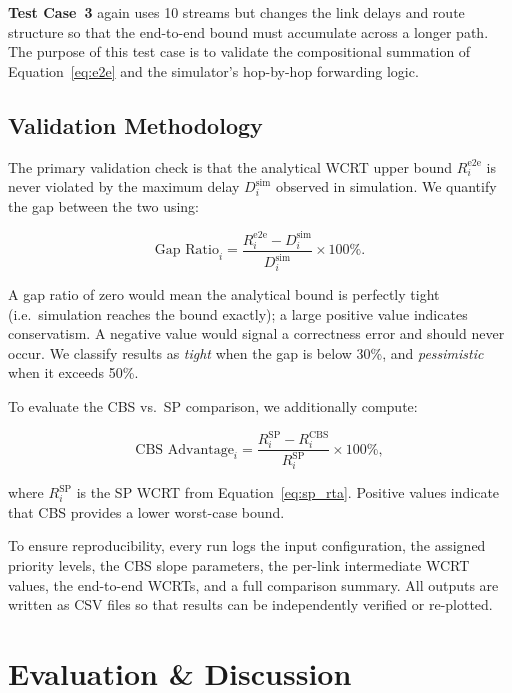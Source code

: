 \documentclass[11pt,a4paper]{article}
\begin{document}
\textbf{Test Case~3} again uses 10 streams but changes the link delays and
route structure so that the end-to-end bound must accumulate across a longer
path.
The purpose of this test case is to validate the compositional summation of
Equation~\eqref{eq:e2e} and the simulator's hop-by-hop forwarding logic.

\subsection{Validation Methodology}

The primary validation check is that the analytical WCRT upper bound
$R_i^{\mathrm{e2e}}$ is never violated by the maximum delay
$D_i^{\mathrm{sim}}$ observed in simulation.
We quantify the gap between the two using:

\begin{equation}
\text{Gap Ratio}_i =
\frac{R_i^{\mathrm{e2e}} - D_i^{\mathrm{sim}}}{D_i^{\mathrm{sim}}}
\times 100\%.
\label{eq:gap}
\end{equation}

A gap ratio of zero would mean the analytical bound is perfectly tight
(i.e.\ simulation reaches the bound exactly); a large positive value
indicates conservatism.
A negative value would signal a correctness error and should never occur.
We classify results as \emph{tight} when the gap is below 30\%, and
\emph{pessimistic} when it exceeds 50\%.

To evaluate the CBS vs.\ SP comparison, we additionally compute:

\begin{equation}
\text{CBS Advantage}_i =
\frac{R_i^{\mathrm{SP}} - R_i^{\mathrm{CBS}}}{R_i^{\mathrm{SP}}}
\times 100\%,
\label{eq:advantage}
\end{equation}

where $R_i^{\mathrm{SP}}$ is the SP WCRT from Equation~\eqref{eq:sp_rta}.
Positive values indicate that CBS provides a lower worst-case bound.

To ensure reproducibility, every run logs the input configuration, the
assigned priority levels, the CBS slope parameters, the per-link
intermediate WCRT values, the end-to-end WCRTs, and a full comparison
summary.
All outputs are written as CSV files so that results can be independently
verified or re-plotted.

\section{Evaluation \& Discussion}
\label{sec:eval}
\end{document}
